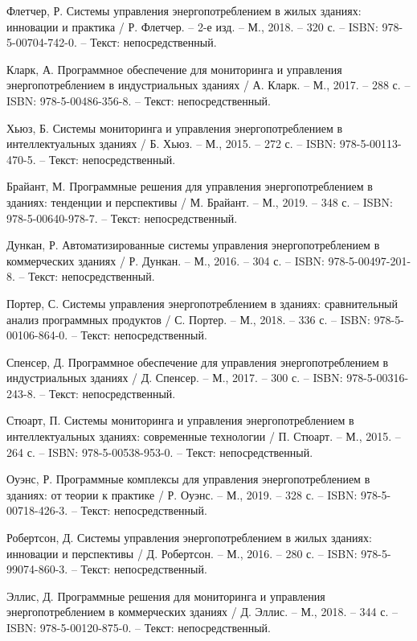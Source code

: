 \begin{thebibliography}{50}
 Флетчер, Р. Системы управления энергопотреблением в жилых зданиях: инновации и практика / Р. Флетчер. – 2-е изд. – М., 2018. – 320 с. – ISBN: 978-5-00704-742-0. – Текст: непосредственный.

 Кларк, А. Программное обеспечение для мониторинга и управления энергопотреблением в индустриальных зданиях / А. Кларк. – М., 2017. – 288 с. – ISBN: 978-5-00486-356-8. – Текст: непосредственный.

 Хьюз, Б. Системы мониторинга и управления энергопотреблением в интеллектуальных зданиях / Б. Хьюз. – М., 2015. – 272 с. – ISBN: 978-5-00113-470-5. – Текст: непосредственный.

 Брайант, М. Программные решения для управления энергопотреблением в зданиях: тенденции и перспективы / М. Брайант. – М., 2019. – 348 с. – ISBN: 978-5-00640-978-7. – Текст: непосредственный.

 Дункан, Р. Автоматизированные системы управления энергопотреблением в коммерческих зданиях / Р. Дункан. – М., 2016. – 304 с. – ISBN: 978-5-00497-201-8. – Текст: непосредственный.

 Портер, С. Системы управления энергопотреблением в зданиях: сравнительный анализ программных продуктов / С. Портер. – М., 2018. – 336 с. – ISBN: 978-5-00106-864-0. – Текст: непосредственный.

 Спенсер, Д. Программное обеспечение для управления энергопотреблением в индустриальных зданиях / Д. Спенсер. – М., 2017. – 300 с. – ISBN: 978-5-00316-243-8. – Текст: непосредственный.

 Стюарт, П. Системы мониторинга и управления энергопотреблением в интеллектуальных зданиях: современные технологии / П. Стюарт. – М., 2015. – 264 с. – ISBN: 978-5-00538-953-0. – Текст: непосредственный.

 Оуэнс, Р. Программные комплексы для управления энергопотреблением в зданиях: от теории к практике / Р. Оуэнс. – М., 2019. – 328 с. – ISBN: 978-5-00718-426-3. – Текст: непосредственный.

 Робертсон, Д. Системы управления энергопотреблением в жилых зданиях: инновации и перспективы / Д. Робертсон. – М., 2016. – 280 с. – ISBN: 978-5-99074-860-3. – Текст: непосредственный.

 Эллис, Д. Программные решения для мониторинга и управления энергопотреблением в коммерческих зданиях / Д. Эллис. – М., 2018. – 344 с. – ISBN: 978-5-00120-875-0. – Текст: непосредственный.


\end{thebibliography}
